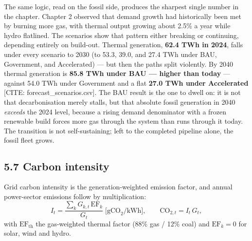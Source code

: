 \documentclass[10pt,twocolumn]{article}
\newcommand{\mk}[1]{{\color{amber}\small #1}}
\begin{document}
The same logic, read on the fossil side, produces the sharpest single number in the chapter. Chapter 2 observed that demand growth had historically been met by burning more gas, with thermal output growing about 2.5\% a year while hydro flatlined. The scenarios show that pattern either breaking or continuing, depending entirely on build-out. Thermal generation, \textbf{62.4 TWh in 2024}, falls under every scenario to 2030 (to 53.3, 39.0, and 27.4 TWh under BAU, Government, and Accelerated) --- but then the paths split violently. By 2040 thermal generation is \textbf{85.8 TWh under BAU --- higher than today} --- against 54.0 TWh under Government and a flat \textbf{27.0 TWh under Accelerated} \mk{[CITE: forecast\_scenarios.csv]}. The BAU result is the one to dwell on: it is not that decarbonisation merely stalls, but that absolute fossil generation in 2040 \textit{exceeds} the 2024 level, because a rising demand denominator with a frozen renewable build forces more gas through the system than runs through it today. The transition is not self-sustaining; left to the completed pipeline alone, the fossil fleet grows.

\subsection*{5.7 Carbon intensity}

\noindent Grid carbon intensity is the generation-weighted emission factor, and
annual power-sector emissions follow by multiplication:
\begin{equation}
I_t=\frac{\sum_k G_{k,t}\,\mathrm{EF}_k}{G_t}\;\bigl[\text{gCO}_2/\text{kWh}\bigr],
\qquad
\mathrm{CO}_{2,t}=I_t\,G_t,
\label{eq:carbon}
\end{equation}
with $\mathrm{EF}_{\mathrm{th}}$ the gas-weighted thermal factor
(88\% gas / 12\% coal) and $\mathrm{EF}_k=0$ for solar, wind and hydro.
\end{document}
